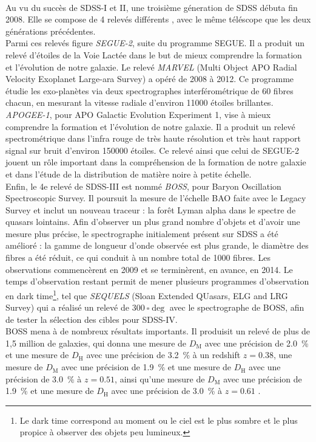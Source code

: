\paragraph{}
Au vu du succès de SDSS-I et II, une troisième géneration de SDSS débuta fin 2008. Elle se compose de 4 relevés différents \autocite{Eisenstein2011}, avec le même téléscope que les deux générations précédentes. \\
Parmi ces relevés figure \emph{SEGUE-2}, suite du programme SEGUE. Il a produit un relevé d'étoiles de la Voie Lactée dans le but de mieux comprendre la formation et l'évolution de notre galaxie. Le relevé \emph{MARVEL} (Multi Object APO Radial Velocity Exoplanet Large-ara Survey) a opéré de 2008 à 2012. Ce programme étudie les exo-planètes via deux spectrographes interférométrique de 60 fibres chacun, en mesurant la vitesse radiale d'environ \num{11000} étoiles brillantes. \emph{APOGEE-1}, pour APO Galactic Evolution Experiment 1, vise à mieux comprendre la formation et l'évolution de notre galaxie. Il a produit un relevé spectrométrique dans l'infra rouge de très haute résolution et très haut rapport signal sur bruit d'environ \num{150000} étoiles. Ce relevé ainsi que celui de SEGUE-2 jouent un rôle important dans la compréhension de la formation de notre galaxie et dans l'étude de la distribution de matière noire à petite échelle.\\
Enfin, le 4e relevé de SDSS-III est nommé \emph{BOSS}, pour Baryon Oscillation Spectroscopic Survey. Il poursuit la mesure de l'échelle BAO faite avec le Legacy Survey et inclut un nouveau traceur : la forêt Lyman alpha dans le spectre de quasars lointains. Afin d'observer un plus grand nombre d'objets et d'avoir une mesure plus précise, le spectrographe initialement présent sur SDSS a été amélioré : la gamme de longueur d'onde observée est plus grande, le diamètre des fibres a été réduit, ce qui conduit à un nombre total de \num{1000} fibres. Les observations commencèrent en 2009 et se terminèrent, en avance, en 2014. Le temps d'observation restant permit de mener plusieurs programmes d'observation en dark time\footnote{Le dark time correspond au moment ou le ciel est le plus sombre et le plus propice à observer des objets peu lumineux.}, tel que \emph{SEQUELS} (Sloan Extended QUasars, ELG and LRG Survey) qui a réalisé un relevé de $\SI{300}{\square\deg}$ avec le spectrographe de BOSS, afin de tester la sélection des cibles pour SDSS-IV.\\
BOSS mena à de nombreux résultats importants.
Il produisit un relevé de plus de 1,5 million de galaxies, qui donna une mesure de $D_{\mathrm{M}}$ avec une précision de \SI{2.0}{\percent} et une mesure de $D_{\mathrm{H}}$ avec une précision de \SI{3.2}{\percent} à un redshift $z=\num{0,38}$, une mesure de $D_{\mathrm{M}}$ avec une précision de \SI{1.9}{\percent} et une mesure de $D_{\mathrm{H}}$ avec une précision de \SI{3.0}{\percent} à $z=\num{0,51}$, ainsi qu'une mesure de $D_{\mathrm{M}}$ avec une précision de \SI{1.9}{\percent} et une mesure de $D_{\mathrm{H}}$ avec une précision de \SI{3.0}{\percent} à $z=\num{0,61}$ \autocite{Alam2016}.
